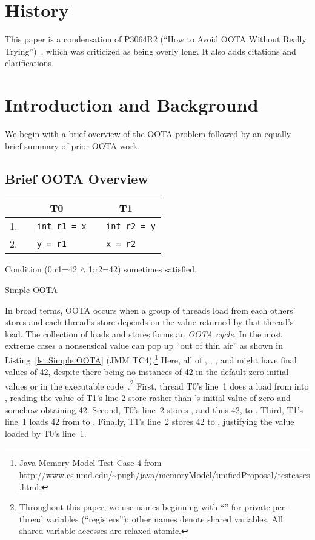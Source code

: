 \section*{History}

This paper is a condensation of P3064R2 (``How to Avoid OOTA Without
Really Trying'')~\cite{PaulEMcKenney2023P3046R2/OOTAwithoutTrying},
which was criticized as being overly long.
It also adds citations and clarifications.

\section{Introduction and Background}
\label{sec:Introduction}

We begin with a brief overview of the OOTA problem followed by an equally
brief summary of prior OOTA work.

\subsection{Brief OOTA Overview}
\label{sec:Brief OOTA Overview}

\begin{listing}[bp]
{
\small
\begin{tabular}{r|l|l}
& \multicolumn{1}{c}{T0} & \multicolumn{1}{c}{T1} \\
\hline
1. &
\texttt{~~int r1 = x} &
	\texttt{~~int r2 = y} \\
2. &
\texttt{~~y = r1} &
	\texttt{~~x = r2} \\
\end{tabular}

\vspace{0.1in}
Condition (0:r1=42 $\wedge$ 1:r2=42)
sometimes satisfied.
}
\caption{Simple OOTA}
\label{lst:Simple OOTA}
\end{listing}

In broad terms, OOTA occurs when a group of threads load from each others'
stores and each thread's store depends on the value returned by that
thread's load.
The collection of loads and stores forms an \emph{OOTA cycle}.
In the most extreme cases a nonsensical value can pop up ``out of thin air''
as shown in
Listing~\ref{lst:Simple OOTA} (JMM TC4).\footnote{
	Java Memory Model Test Case 4 from
	\url{http://www.cs.umd.edu/~pugh/java/memoryModel/unifiedProposal/testcases.html}.}
Here, all of , , , and  might have final
values of 42, despite there being no instances of 42 in the default-zero
initial values or in the executable
code~\cite{PaulEMcKenney2020RelaxedGuideRelaxed}.\footnote{
	Throughout this paper, we use names beginning with ``''
	for private per-thread variables (``registers''); other names
	denote shared variables.
	All shared-variable accesses are relaxed atomic.}
First, thread T0's line~1 does a load from  into ,
reading the value of T1's line-2 store rather than 's initial
value of zero and somehow obtaining 42.
Second, T0's line~2 stores , and thus 42, to .
Third, T1's line~1 loads 42 from  to .
Finally, T1's line~2 stores 42 to , justifying the value loaded
by T0's line~1.

